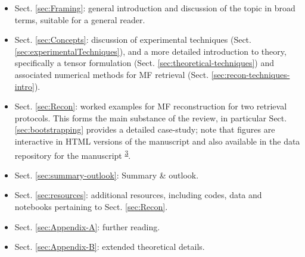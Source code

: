 \documentclass[10pt]{article}
\begin{document}
\begin{itemize}
\item Sect. \ref{sec:Framing}: general introduction and discussion of the topic in broad terms, suitable for a general reader.
\item Sect. \ref{sec:Concepts}: discussion of experimental techniques (Sect. \ref{sec:experimentalTechniques}), and a more detailed introduction to theory, specifically a tensor formulation  (Sect. \ref{sec:theoretical-techniques}) and associated numerical methods for MF retrieval (Sect. \ref{sec:recon-techniques-intro}).
\item Sect. \ref{sec:Recon}: worked examples for MF reconstruction for two retrieval protocols. This forms the main substance of the review, in particular Sect. \ref{sec:bootstrapping} provides a detailed case-study; note that figures are interactive in HTML versions of the manuscript and also available in the data repository for the manuscript \textsuperscript{\hyperref[csl:3]{3}}.
\item Sect. \ref{sec:summary-outlook}: Summary \& outlook.
\item Sect. \ref{sec:resources}: additional resources, including codes, data and notebooks pertaining to Sect. \ref{sec:Recon}.
\item Sect. \ref{sec:Appendix-A}: further reading.
\item Sect. \ref{sec:Appendix-B}: extended theoretical details.
\end{itemize}


\end{document}
